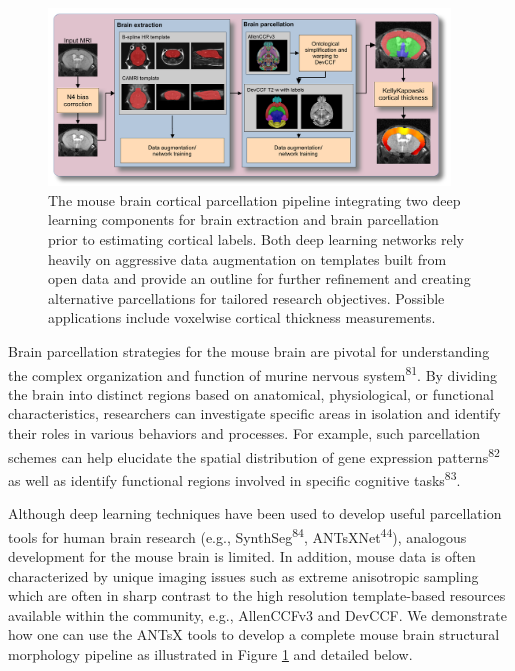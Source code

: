 \documentclass[
  12pt,
]{article}
\begin{document}
\begin{figure}
\centering
\includegraphics[width=0.95\textwidth]{Figures/mousePipeline.pdf}
\caption{The mouse brain cortical parcellation pipeline integrating two deep
learning components for brain extraction and brain parcellation prior to
estimating cortical labels. Both deep learning networks rely heavily on
aggressive data augmentation on templates built from open data and provide an
outline for further refinement and creating alternative parcellations for
tailored research objectives.  Possible applications include
voxelwise cortical thickness measurements.}
\label{fig:mouseKK}
\end{figure}

Brain parcellation strategies for the mouse brain are pivotal for
understanding the complex organization and function of murine nervous
system\textsuperscript{81}. By dividing the brain into distinct regions
based on anatomical, physiological, or functional characteristics,
researchers can investigate specific areas in isolation and identify
their roles in various behaviors and processes. For example, such
parcellation schemes can help elucidate the spatial distribution of gene
expression patterns\textsuperscript{82} as well as identify functional
regions involved in specific cognitive tasks\textsuperscript{83}.

Although deep learning techniques have been used to develop useful
parcellation tools for human brain research (e.g.,
SynthSeg\textsuperscript{84}, ANTsXNet\textsuperscript{44}), analogous
development for the mouse brain is limited. In addition, mouse data is
often characterized by unique imaging issues such as extreme anisotropic
sampling which are often in sharp contrast to the high resolution
template-based resources available within the community, e.g.,
AllenCCFv3 and DevCCF. We demonstrate how one can use the ANTsX tools to
develop a complete mouse brain structural morphology pipeline as
illustrated in Figure \ref{fig:mouseKK} and detailed below.
\end{document}
